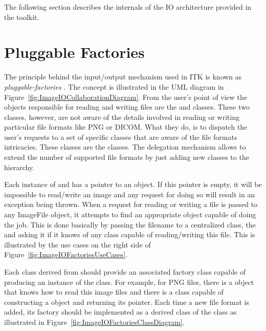The following section describes the internals of the IO architecture provided
in the toolkit.

\section{Pluggable Factories}
\label{sec:ImageIOPluggableFactories}

The principle behind the input/output mechanism used in ITK is known as
\emph{pluggable-factories} \cite{Gamma1995}. The concept is illustrated in the
UML diagram in Figure~\ref{fig:ImageIOCollaborationDiagram}. From the user's
point of view the objects responsible for reading and writing files are the
 and  classes. These two
classes, however, are not aware of the details involved in reading or writing
particular file formats like PNG or DICOM.  What they do, is to dispatch the
user's requests to a set of specific classes that are aware of the file formats
intricacies. These classes are the  classes. The delegation
mechanism allows to extend the number of supported file formats by just adding
new classes to the  hierarchy.

Each instance of  and  has a
pointer to an  object. If this pointer is empty, it will be
impossible to read/write an image and any request for doing so will result in
an exception being thrown. When a request for reading or writing a file is
passed to any ImageFile object, it attempts to find an appropriate
 object capable of doing the job. This is done basically by
passing the filename to a centralized class, the  and
asking it if it knows of any  class capable of reading/writing
this file. This is illustrated by the use cases on the right side of
Figure~\ref{fig:ImageIOFactoriesUseCases}.

Each class derived from  should provide an associated factory
class capable of producing an instance of the  class. For
example, for PNG files, there is a  object that knows how
to read this image files and there is a  class
capable of constructing a  object and returning its pointer.
Each time a new file format is added, its factory should be implemented as a
derived class of the  class as illustrated in
Figure~\ref{fig:ImageIOFactoriesClassDiagram}. 

